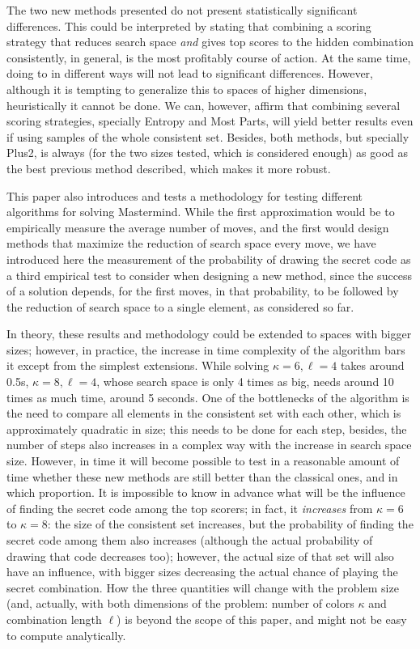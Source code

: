 \documentclass[preprint,12pt]{elsarticle}
\begin{document}
The two new methods presented do not present statistically significant
differences. This could be interpreted by stating that combining a scoring
strategy that reduces search space {\em and} gives top scores to the
hidden combination consistently, in general, is the most profitably
course of action. At the same time, doing to in different ways will
not lead to significant differences. However, although it is tempting
to generalize this to spaces of higher dimensions, heuristically it
cannot be done. We can, however, affirm that combining several scoring
strategies, specially Entropy and Most Parts, will yield better
results even if using samples of the whole consistent set. Besides,
both methods, but specially Plus2, is always (for the two sizes
tested, which is considered enough) as good as the best previous
method described, which makes it more robust.

This paper also introduces and tests a methodology for testing
different algorithms for solving Mastermind. While the first
approximation would be to empirically measure the average number of
moves, and the first would design methods that maximize the reduction
of search space every move, we have introduced here the measurement of
the probability of drawing the secret code as a third empirical test
to consider when designing a new method, since the success of a
solution depends, for the first moves, in that probability, to be
followed by the reduction of search space to a single element, as
considered so far.

In theory, these results and methodology could be extended to spaces with bigger sizes;
however, in practice, the increase in time complexity of the algorithm
bars it except from the simplest extensions. While solving  $\kappa=6,
\ell=4$ takes around 0.5s, $\kappa=8,\ell=4$, whose search space is
only 4 times as big, needs around 10 times as much time, around 5
seconds. One of the bottlenecks of the algorithm is the need to
compare all elements in the consistent set with each other, which is
approximately quadratic in size; this needs to be done for each
step, besides, the number of steps also increases in a complex way
with the increase in search space size. However, in time it will
become possible to test in a reasonable amount of time whether these
new methods are still better than the classical ones, and in which
proportion. It is impossible to know in advance what will be the
influence of finding the secret code among the top scorers; in fact,
it {\em increases} from  $\kappa=6$ to $\kappa=8$: the size of the
consistent set increases, but  the probability of finding
the secret code among them also increases (although the actual
probability of drawing that code decreases too); however, the actual size of
that set will also have an influence, with bigger sizes decreasing the
actual chance of playing the secret combination. How the three
quantities will change with the problem size (and, actually, with both
dimensions of the problem: number of colors $\kappa$ and combination
length $\ell$) is beyond the scope of this paper, and might not be easy
to compute analytically. 
\end{document}
